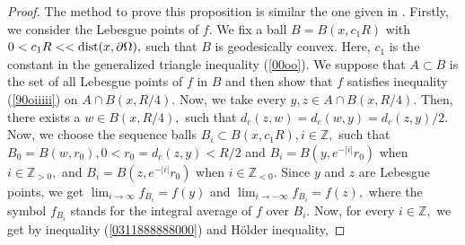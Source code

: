 \documentclass[11pt,twoside]{article}
\theoremstyle{definition}
\theoremstyle{remark}
\begin{document}
\begin{proof}
The method to prove this proposition is similar the one given in \cite{DKO24}. Firstly, we consider the Lebesgue points of $f.$ We fix a ball $B=B(x,c_{1}R)$ with $0<c_{1}R<<{\rm dist}(x,\partial\Omega),$ such that 
$B$ is geodesically convex.  Here, $c_{1}$ is the constant in the generalized triangle inequality (\ref{00oo}). We suppose that $A\subset B$ is the set of all Lebesgue points of $f$ in $B$ and then show that $f$ satisfies inequality (\ref{90oiiiii}) on $A\cap B(x,R/4).$ Now, we take every $y,z\in A\cap B(x,R/4).$ Then, there exists a $w\in B(x,R/4),$ such that $d_{c}(z,w)=d_{c}(w,y)=d_{c}(z,y)/2.$ Now, we choose the sequence balls $B_{i}\subset B(x,c_{1}R),i\in\mathbb{Z},$ such that $B_{0}=B(w,r_{0}),0<r_{0}=d_{c}(z,y)<R/2$ and $B_{i}=B(y,e^{-\vert i\vert}r_{0})$ when $i\in \mathbb{Z}_{>0},$ and $B_{i}=B(z,e^{-\vert i\vert}r_{0})$ when $i\in \mathbb{Z}_{<0}.$ Since $y$ and
$z$ are Lebesgue points, we get 
$\lim_{i\rightarrow\infty}f_{B_{i}}=f(y)$ and $\lim_{i\rightarrow-\infty}f_{B_{i}}=f(z),$ where the symbol $f_{B_{i}}$ stands for the integral average of $f$ over $B_{i}.$ Now, for every $i\in\mathbb{Z},$ we get by inequality (\ref{0311888888000}) and H\"{o}lder inequality,


\end{proof}
\end{document}
